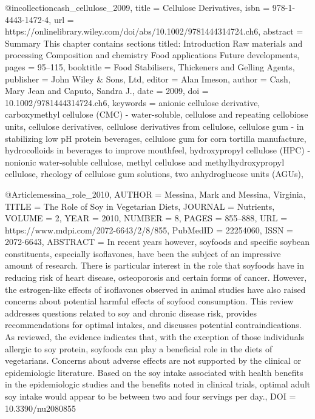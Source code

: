 
@incollection{cash_cellulose_2009,
	title = {Cellulose Derivatives},
	isbn = {978-1-4443-1472-4},
	url = {https://onlinelibrary.wiley.com/doi/abs/10.1002/9781444314724.ch6},
	abstract = {Summary This chapter contains sections titled: Introduction Raw materials and processing Composition and chemistry Food applications Future developments},
	pages = {95--115},
	booktitle = {Food Stabilisers, Thickeners and Gelling Agents},
	publisher = {John Wiley \& Sons, Ltd},
	editor = {Alan Imeson},
	author = {Cash, Mary Jean and Caputo, Sandra J.},
	date = {2009},
	doi = {10.1002/9781444314724.ch6},
	keywords = {anionic cellulose derivative, carboxymethyl cellulose ({CMC}) - water-soluble, cellulose and repeating cellobiose units, cellulose derivatives, cellulose derivatives from cellulose, cellulose gum - in stabilizing low {pH} protein beverages, cellulose gum for corn tortilla manufacture, hydrocolloids in beverages to improve mouthfeel, hydroxypropyl cellulose ({HPC}) - nonionic water-soluble cellulose, methyl cellulose and methylhydroxypropyl cellulose, rheology of cellulose gum solutions, two anhydroglucose units ({AGUs})},
}


@Article{messina_role_2010,
AUTHOR = {Messina, Mark and Messina, Virginia},
TITLE = {The {R}ole of {S}oy in {V}egetarian {D}iets},
JOURNAL = {Nutrients},
VOLUME = {2},
YEAR = {2010},
NUMBER = {8},
PAGES = {855--888},
URL = {https://www.mdpi.com/2072-6643/2/8/855},
PubMedID = {22254060},
ISSN = {2072-6643},
ABSTRACT = {In recent years however, soyfoods and specific soybean constituents, especially isoflavones, have been the subject of an impressive amount of research. There is particular interest in the role that soyfoods have in reducing risk of heart disease, osteoporosis and certain forms of cancer. However, the estrogen-like effects of isoflavones observed in animal studies have also raised concerns about potential harmful effects of soyfood consumption. This review addresses questions related to soy and chronic disease risk, provides recommendations for optimal intakes, and discusses potential contraindications. As reviewed, the evidence indicates that, with the exception of those individuals allergic to soy protein, soyfoods can play a beneficial role in the diets of vegetarians. Concerns about adverse effects are not supported by the clinical or epidemiologic literature. Based on the soy intake associated with health benefits in the epidemiologic studies and the benefits noted in clinical trials, optimal adult soy intake would appear to be between two and four servings per day.},
DOI = {10.3390/nu2080855}
}


